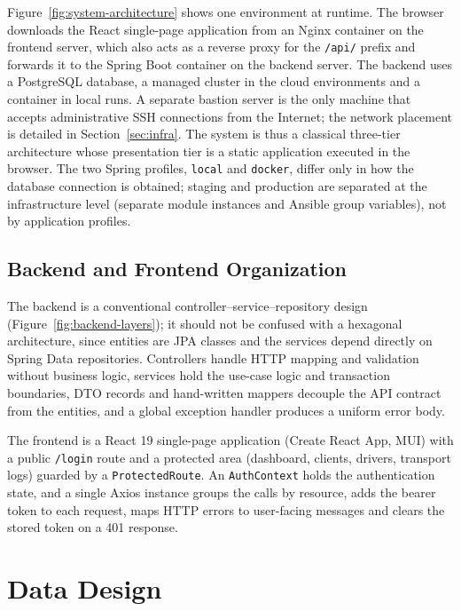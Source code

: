 Figure~\ref{fig:system-architecture} shows one environment at runtime. The browser downloads the React single-page application from an Nginx container on the frontend server, which also acts as a reverse proxy for the \texttt{/api/} prefix and forwards it to the Spring Boot container on the backend server. The backend uses a PostgreSQL database, a managed cluster in the cloud environments and a container in local runs. A separate bastion server is the only machine that accepts administrative SSH connections from the Internet; the network placement is detailed in Section~\ref{sec:infra}. The system is thus a classical three-tier architecture whose presentation tier is a static application executed in the browser. The two Spring profiles, \texttt{local} and \texttt{docker}, differ only in how the database connection is obtained; staging and production are separated at the infrastructure level (separate module instances and Ansible group variables), not by application profiles.



\subsection{Backend and Frontend Organization}

The backend is a conventional controller--service--repository design (Figure~\ref{fig:backend-layers}); it should not be confused with a hexagonal architecture, since entities are JPA classes and the services depend directly on Spring Data repositories. Controllers handle HTTP mapping and validation without business logic, services hold the use-case logic and transaction boundaries, DTO records and hand-written mappers decouple the API contract from the entities, and a global exception handler produces a uniform error body.



The frontend is a React 19 single-page application (Create React App, MUI) with a public \texttt{/login} route and a protected area (dashboard, clients, drivers, transport logs) guarded by a \texttt{ProtectedRoute}. An \texttt{AuthContext} holds the authentication state, and a single Axios instance groups the calls by resource, adds the bearer token to each request, maps HTTP errors to user-facing messages and clears the stored token on a 401 response.

\section{Data Design}

